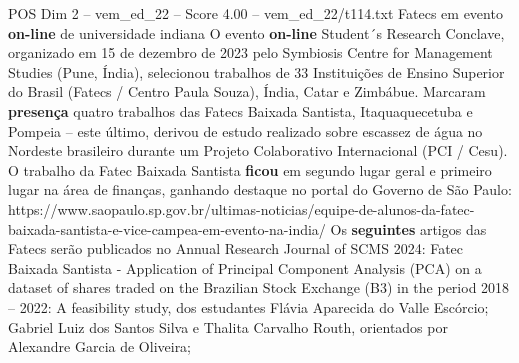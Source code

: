 \begin{textsample}{POS Dim 2 – vem\_ed\_22 – Score 4.00 – vem\_ed\_22/t114.txt}  \label{ex:f2_pos_178}
Fatecs em evento \textbf{on-line} de universidade indiana O evento \textbf{on-line} Student´s Research Conclave, organizado em 15 de dezembro de 2023 pelo Symbiosis Centre for Management Studies (Pune, Índia), selecionou trabalhos de 33 Instituições de Ensino Superior do Brasil (Fatecs / Centro Paula Souza), Índia, Catar e Zimbábue.
Marcaram \textbf{presença} quatro trabalhos das Fatecs Baixada Santista, Itaquaquecetuba e Pompeia – este último, derivou de estudo realizado sobre escassez de água no Nordeste brasileiro durante um Projeto Colaborativo Internacional (PCI / Cesu).
O trabalho da Fatec Baixada Santista \textbf{ficou} em segundo lugar geral e primeiro lugar na área de finanças, ganhando destaque no portal do Governo de São Paulo: https://www.saopaulo.sp.gov.br/ultimas-noticias/equipe-de-alunos-da-fatec-baixada-santista-e-vice-campea-em-evento-na-india/ Os \textbf{seguintes} artigos das Fatecs serão publicados no Annual Research Journal of SCMS 2024: Fatec Baixada Santista - Application of Principal Component Analysis (PCA) on a dataset of shares traded on the Brazilian Stock Exchange (B3) in the period 2018 – 2022: A feasibility study, dos estudantes Flávia Aparecida do Valle Escórcio; Gabriel Luiz dos Santos Silva e Thalita Carvalho Routh, orientados por Alexandre Garcia de Oliveira;

\end{textsample}
